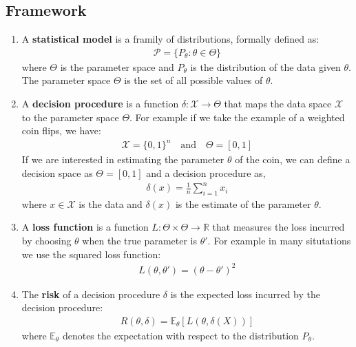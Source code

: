 \documentclass[letterpaper, 11pt]{article}
\let\mc\mathcal
\newcommand{\R}{\mathbb{R}}	%
\newcommand{\E}{\mathbb{E}}	%
\newcommand{\1}{\mathds{1}}	%
\theoremstyle{definition}
\begin{document}
\subsection{Framework}
\begin{enumerate}
    \item A \textbf{statistical model} is a framily of distributions, formally defined as:
    \begin{align}
        \mc{P} = \{P_{\theta} : \theta \in \Theta\}
    \end{align}
    where $\Theta$ is the parameter space and $P_{\theta}$ is the distribution of the data given $\theta$. The parameter space $\Theta$ is the set of all possible values of $\theta$.
    \item A \textbf{decision procedure} is a function $\delta : \mc{X} \to \Theta$ that maps the data space $\mc{X}$ to the parameter space $\Theta$.
    For example if we take the example of a weighted coin flips, we have:
    \begin{align}
        \mc{X} = \{0,1\}^n \quad \text{and} \quad \Theta = [0,1]
    \end{align}
    If we are interested in estimating the parameter $\theta$ of the coin, we can define a decision 
    space as $\Theta = [0,1]$ and a decision procedure as,
    \begin{align}
        \delta(x) = \frac{1}{n} \sum_{i=1}^{n} x_i
    \end{align}
    where $x \in \mc{X}$ is the data and $\delta(x)$ is the estimate of the parameter $\theta$. 
    \item A \textbf{loss function} is a function $L : \Theta \times \Theta \to \R$ that measures the loss incurred by choosing $\theta$ when the true parameter is $\theta'$.
    For example in many situtations we use the squared loss function:
    \begin{align}
        L(\theta, \theta') = (\theta - \theta')^2
    \end{align}
    \item The \textbf{risk} of a decision procedure $\delta$ is the expected loss incurred by the decision procedure:
    \begin{align}
        R(\theta, \delta) = \E_{\theta}[L(\theta, \delta(X))]
    \end{align}
    where $\E_{\theta}$ denotes the expectation with respect to the distribution $P_{\theta}$.
\end{enumerate}
\end{document}
